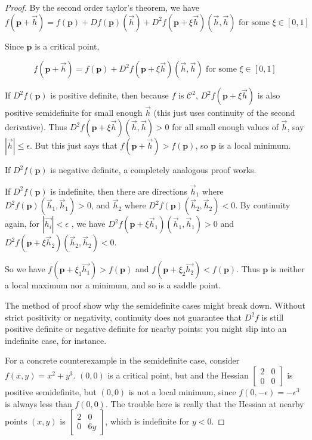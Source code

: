 \documentclass{ximera}
\begin{document}
	\begin{proof}
		By the second order taylor's theorem, we have 
		\[
			f(\mathbf{p} + \vec{h}) = f(\mathbf{p}) + Df(\mathbf{p})(\vec{h})+D^2f(\mathbf{p}+\xi\vec{h})(\vec{h},\vec{h}) \text{ for some } \xi \in [0,1]
		\]
		
		Since $\mathbf{p}$ is a critical point,
		
		\[
			f(\mathbf{p} + \vec{h}) = f(\mathbf{p}) + D^2f(\mathbf{p}+\xi\vec{h})(\vec{h},\vec{h}) \text{ for some } \xi \in [0,1]
		\]
		
		If  $D^2f(\mathbf{p})$ is positive definite, then because $f$ is $\mathcal{C}^2$,  $D^2f(\mathbf{p}+\xi\vec{h})$ is also positive semidefinite for 
		small enough $\vec{h}$ (this just uses continuity of the second derivative).  Thus $D^2f(\mathbf{p}+\xi\vec{h})(\vec{h},\vec{h}) > 0$ for
		all small enough values of $\vec{h}$, say $|\vec{h}| \leq \epsilon$.  But this just says that $f(\mathbf{p}+\vec{h}) > f(\mathbf{p})$, so $\mathbf{p}$
		is a local minimum.
		
		If $D^2f(\mathbf{p})$ is negative definite, a completely analogous proof works.
		
		If $D^2f(\mathbf{p})$ is indefinite, then there are directions $\vec{h}_1$ where $D^2f(\mathbf{p})(\vec{h}_1,\vec{h}_1) > 0$, 
		and $\vec{h}_2$ where $D^2f(\mathbf{p})(\vec{h}_2,\vec{h}_2) < 0$.  By continuity again, for $|\vec{h_i}| < \epsilon$ , we have
		$D^2f(\mathbf{p}+\xi\vec{h}_1)(\vec{h}_1,\vec{h}_1) > 0$ and $D^2f(\mathbf{p}+\xi\vec{h}_2)(\vec{h}_2,\vec{h}_2) < 0$.
		
		So we have $f(\mathbf{p}+\xi_1\vec{h_1}) > f(\mathbf{p})$ and $f(\mathbf{p}+\xi_2\vec{h_2}) < f(\mathbf{p})$.   Thus $\mathbf{p}$ is neither a local 
		maximum nor a minimum, and so is a saddle point.
		
		The method of proof show why the semidefinite cases might break down.  Without strict positivity or negativity, continuity does not guarantee  
		that $D^2f$ is still positive definite or negative definite for nearby points:  you might slip into an indefinite case, for instance.
		
		For a concrete counterexample in the semidefinite case, consider $f(x,y) = x^2+y^3$.  $(0,0)$ is a critical point, but
		and the Hessian \(\begin{bmatrix} 2 & 0\\0&0\end{bmatrix}\) is positive semidefinite, but $(0,0)$ is not a local minimum, 
		since $f(0,-\epsilon) = -\epsilon^3$ is always less than $f(0,0)$.  The trouble here is really that the Hessian at nearby points $(x,y)$ is
		\(\begin{bmatrix} 2 & 0\\0&6y\end{bmatrix}\), which is indefinite for $y<0$.  				
	\end{proof}
	
\end{document}
